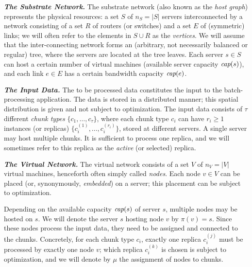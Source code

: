 \documentclass[preprint,12pt]{elsarticle}
\newcommand{\MaFactor}{m}
\newcommand{\ChunkType}{\tau}
\newcommand{\VirtualNodes}{\ensuremath{V}}
\newcommand{\achunk}{\ensuremath{c}}
\newcommand{\capacity}{\emph{cap}}
\begin{document}
\textbf{\emph{The Substrate Network.}} The substrate network (also known as the \emph{host graph}) represents the physical resources:
a set $S$ of $n_S=|S|$ servers interconnected by a network consisting of a set $R$ of routers (or switches)
and a set $E$ of (symmetric) links; we will often refer to the elements in $S\cup R$
as the \emph{vertices}. We will assume that the inter-connecting network forms an (arbitrary, not necessarily balanced
or regular) tree,
where the servers are located at the tree leaves.
Each server $s\in S$ can host a certain number
of virtual machines (available server capacity $\capacity(s)$), and each link $e\in E$ has a certain bandwidth
capacity $\capacity(e)$.

\textbf{\emph{The Input Data.}} The to be processed data constitutes the input to the batch-processing application.
The data is stored in a distributed manner; this spatial distribution is given and not subject to optimization.
The input data consists of $\tau$ different \emph{chunk types} $\{\achunk_1, \ldots, \achunk_{\ChunkType}\}$,
where each chunk type $\achunk_i$ can have $r_i\geq 1$ instances (or replicas) $\{\achunk_{i}^{(1)},\ldots, \achunk_{i}^{(r_i)}\}$,
 stored at different servers. A single server may host multiple chunks.
It is sufficient to process one replica, and we will sometimes refer to this
replica as the \emph{active} (or selected) replica.

\textbf{\emph{The Virtual Network.}} The virtual network consists of a set $\VirtualNodes$ of $n_V=|\VirtualNodes|$ virtual machines,
henceforth often simply called \emph{nodes}.
Each node $v \in \VirtualNodes$ can be placed (or, synonymously, \emph{embedded}) on a server; this placement can be subject
to optimization.

Depending on the available capacity $\capacity(s)$ of server $s$, multiple nodes may be hosted on $s$.
We will denote the server $s$ hosting node $v$ by $\pi(v)=s$.
Since these nodes process the input data, they need to be assigned and connected to the
chunks. Concretely, for each chunk type $\achunk_i$, exactly one
replica $\achunk_{i}^{(j)}$ must be processed by exactly one node $v$;
which replica $\achunk_{i}^{(k)}$ is chosen is subject to optimization, and
we will denote by $\mu$ the assignment of nodes to chunks.
\end{document}
